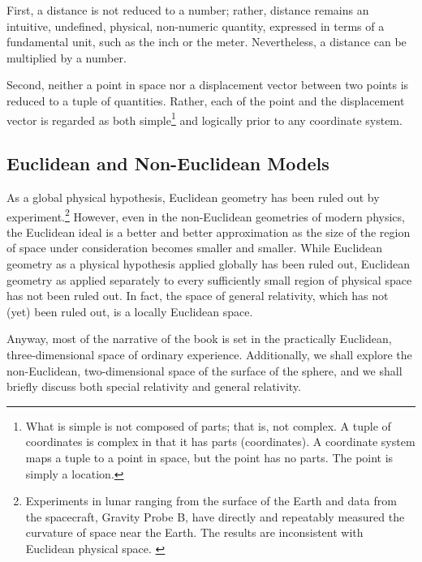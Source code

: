 First, a distance is not reduced to a number; rather, distance remains an
intuitive, undefined, physical, non-numeric quantity, expressed in terms of a
fundamental unit, such as the inch or the meter.  Nevertheless, a distance can
be multiplied by a number.

Second, neither a point in space nor a displacement vector between two points
is reduced to a tuple of quantities.  Rather, each of the point and the
displacement vector is regarded as both simple\footnote{%
   What is simple is not composed of parts; that is, not complex.  A tuple of
   coordinates is complex in that it has parts (coordinates).  A coordinate
   system maps a tuple to a point in space, but the point has no parts.  The
   point is simply a location.%
}
and logically prior to any coordinate system.

\subsection{Euclidean and Non-Euclidean Models}

As a global physical hypothesis, Euclidean geometry has been ruled out by
experiment.\footnote{%
   Experiments in lunar ranging from the surface of the Earth and data from the
   spacecraft, Gravity Probe B, have directly and repeatably measured the
   curvature of space near the Earth. The results are inconsistent with
   Euclidean physical space.  \citep{gpb-2011, miller-geodetic}
}
However, even in the non-Euclidean geometries of modern physics, the Euclidean
ideal is a better and better approximation as the size of the region of space
under consideration becomes smaller and smaller.  While Euclidean geometry as a
physical hypothesis applied globally has been ruled out, Euclidean geometry as
applied separately to every sufficiently small region of physical space has not
been ruled out.  In fact, the space of general relativity, which has not (yet)
been ruled out, is a locally Euclidean space.

Anyway, most of the narrative of the book is set in the practically Euclidean,
three-dimensional space of ordinary experience. Additionally, we shall explore
the non-Euclidean, two-dimensional space of the surface of the sphere, and we
shall briefly discuss both special relativity and general relativity.

